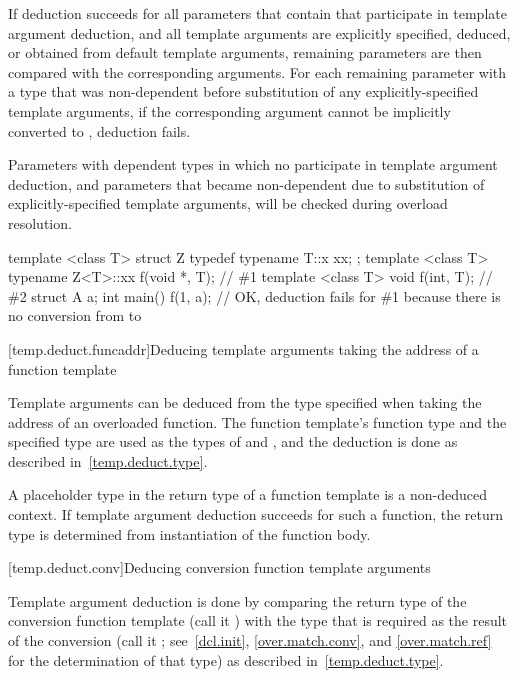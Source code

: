 \pnum
If deduction succeeds for all parameters that contain
 that participate in template argument
deduction, and all template arguments are explicitly specified, deduced,
or obtained from default template arguments, remaining parameters are then
compared with the corresponding arguments. For each remaining parameter
 with a type that was non-dependent before substitution of any
explicitly-specified template arguments, if the corresponding argument
 cannot be implicitly converted to , deduction fails.
\begin{note}
Parameters with dependent types in which no 
participate in template argument deduction, and parameters that became
non-dependent due to substitution of explicitly-specified template arguments,
will be checked during overload resolution.
\end{note}
\begin{example}
\begin{codeblock}
  template <class T> struct Z {
    typedef typename T::x xx;
  };
  template <class T> typename Z<T>::xx f(void *, T);    // \#1
  template <class T> void f(int, T);                    // \#2
  struct A {} a;
  int main() {
    f(1, a);        // OK, deduction fails for \#1 because there is no conversion from  to 
  }
\end{codeblock}
\end{example}

[temp.deduct.funcaddr]{Deducing template arguments taking the address of a function template}

\pnum
Template arguments can be deduced from the type specified when taking
the address of an overloaded function.
The function template's function type and the specified type
are used as the types of
and
,
and the deduction is done as
described in~\ref{temp.deduct.type}.

\pnum
A placeholder type in the return type of a
function template is a non-deduced context. If template argument
deduction succeeds for such a function, the return type is determined
from instantiation of the function body.

[temp.deduct.conv]{Deducing conversion function template arguments}

\pnum
Template argument deduction is done by comparing the return type of
the
conversion function template
(call it
)
with the type that is
required as the result of the conversion (call it
; see~\ref{dcl.init}, \ref{over.match.conv}, and \ref{over.match.ref}
for the determination of that type)
as described in~\ref{temp.deduct.type}.

